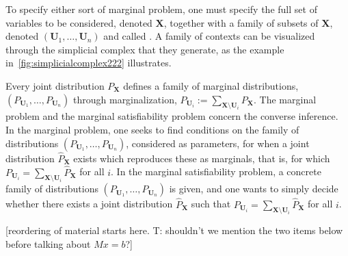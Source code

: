 {%
To specify either sort of marginal problem, 
one must specify the full set of variables to be considered, denoted $\bm{X}$, together with a family of subsets of $\bm{X}$, denoted $(\bm{U}_1,\ldots,\bm{U}_n)$ and called .
A family of contexts can be visualized through 
the simplicial complex that they generate, as the example in~\cref{fig:simplicialcomplex222} illustrates. 

Every joint distribution $P_{\bm{X}}$ %
defines a family of marginal distributions, $(P_{\bm{U}_1},\ldots,P_{\bm{U}_n})$ through marginalization,  $P_{\bm{U}_i} := \sum_{\bm{X} \setminus \bm{U}_i} P_{\bm{X}}$.  
 The marginal problem and the marginal satisfiability problem concern 
 the converse inference.  
In the marginal problem, one seeks to find conditions on the family of distributions $(P_{\bm{U}_1},\ldots,P_{\bm{U}_n})$, considered as parameters, for when a joint distribution $\hat{P}_{\bm{X}}$ exists which reproduces these as marginals, that is, for which $P_{\bm{U}_i} = \sum_{\bm{X}\setminus\bm{U}_i} \hat{P}_{\bm{X}}$ for all $i$.
In the marginal satisfiability problem, a concrete family of distributions $(P_{\bm{U}_1},\ldots,P_{\bm{U}_n})$ is given, and one wants to simply decide whether there exists a joint distribution $\hat{P}_{\bm{X}}$ such that $P_{\bm{U}_i} = \sum_{\bm{X}\setminus\bm{U}_i} \hat{P}_{\bm{X}}$ for all $i$.

  
  \color{blue} [reordering of material starts here. T: shouldn't we mention the two items below before talking about $Mx=b$?]\color{black}
  
}
